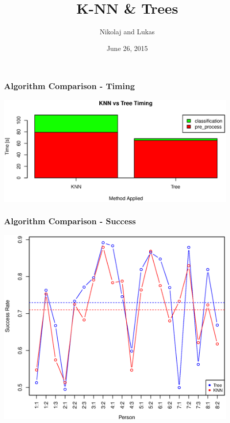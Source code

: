 \documentclass[12pt,a4paper]{beamer}
\begin{document}
\begin{frame}
\author{Nikolaj and Lukas}
\date{June 26, 2015}
\title{K-NN \& Trees}
\maketitle
\end{frame}

\centering



% 
% 
% 
% 
% 
% 



\begin{frame}
\frametitle{Algorithm Comparison - Timing}
\includegraphics[width=0.9\textwidth]{../Report/graphics/algo_compare_timing}
\end{frame}

\begin{frame}
\frametitle{Algorithm Comparison - Success}
\includegraphics[width=0.9\textwidth]{../Report/graphics/success_comp_hard}
\end{frame}
\end{document}
